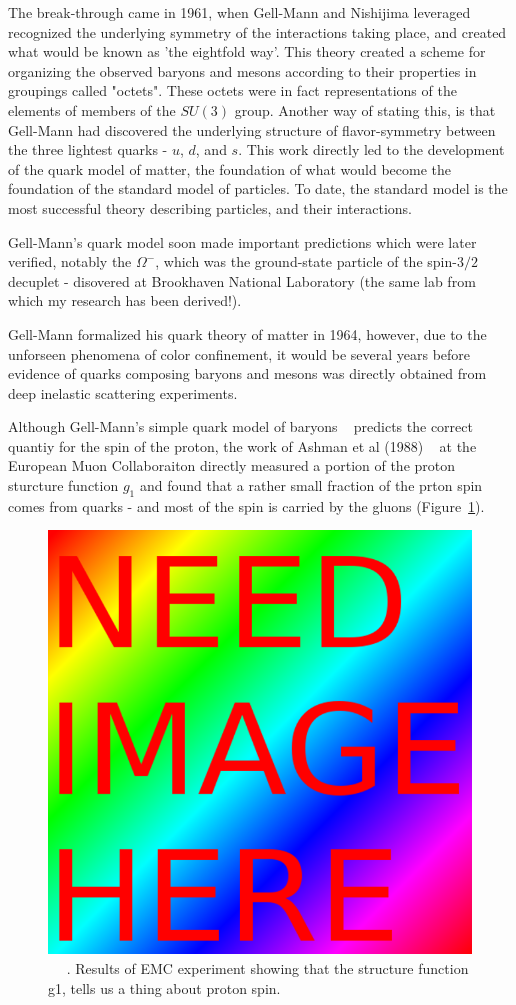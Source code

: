 The break-through came in 1961, when Gell-Mann and Nishijima leveraged
recognized the underlying symmetry of the interactions taking place, and created
what would be known as 'the eightfold way'. This theory created a scheme for
organizing the observed baryons and mesons according to their properties in
groupings called "octets". These octets were in fact representations of the
elements of members of the $SU(3)$ group. Another way of stating this, is that
Gell-Mann had discovered the underlying structure of flavor-symmetry between the
three lightest quarks - $u$, $d$, and $s$. This work directly led to the
development of the quark model of matter, the foundation of what would become
the foundation of the standard model of particles. To date, the standard model
is the most successful theory describing particles, and their interactions.

Gell-Mann's quark model soon made important predictions which were later
verified, notably the $\Omega^{-}$, which was the ground-state particle of the
spin-$3/2$ decuplet - disovered at Brookhaven National Laboratory (the same lab
from which my research has been derived!). 

Gell-Mann formalized his quark theory of matter in 1964, however, due to the
unforseen phenomena of color confinement, it would be several years before
evidence of quarks composing baryons and mesons was directly obtained from deep
inelastic scattering experiments.

Although Gell-Mann's simple quark model of baryons ~\cite{Gell-Mann1961}
predicts the correct quantiy for the spin of the proton, the work of Ashman et
al (1988) ~\needcite{} at the European Muon Collaboraiton directly measured a
portion of the proton sturcture function $g_1$ and found that a rather small
fraction of the prton spin comes from quarks - and most of the spin is carried
by the gluons (Figure~\ref{fig:emc_g1_result}).

\begin{figure}[ht]
	\begin{center}
	\includegraphics[width=0.5\linewidth]{../filler/squareimg.png}
	\caption{~\needfig{} ~\needcap{}. Results of EMC experiment showing that the structure
	function g1, tells us a thing about proton spin.}
	\label{fig:emc_g1_result}
\end{center}
\end{figure}

